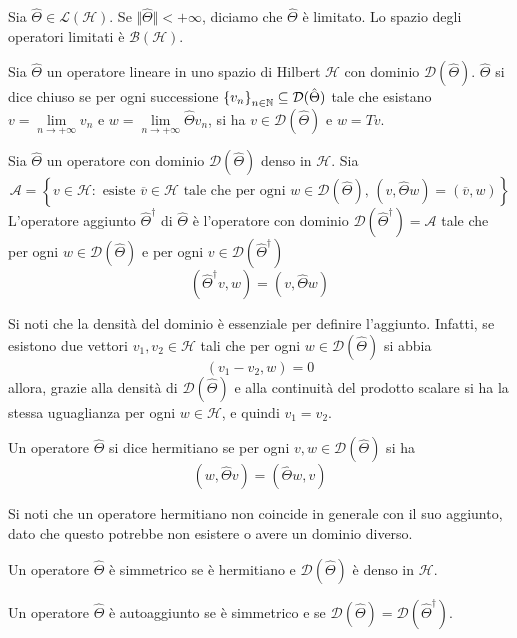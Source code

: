 \documentclass[a4paper, 11pt]{article}
\renewcommand{\H}{\mathcal{H}}
\begin{document}
\begin{definition}
	Sia $\hat{\Theta}\in\mathcal{L}(\H)$. Se $\Vert{\hat{\Theta}}\Vert<+\infty$, diciamo che $\hat{\Theta}$ è limitato. Lo spazio degli operatori limitati è $\mathcal{B}(\H)$.
\end{definition}
\begin{definition}
	Sia $\hat{\Theta}$ un operatore lineare in uno spazio di Hilbert $\H$ con dominio $\mathcal{D}(\hat{\Theta})$. $\hat{\Theta}$ si dice chiuso se per ogni successione $\left\{v_n\right\}_{n\in\mathbb{N}}\subseteq\mathcal{D}(\hat{\Theta})$ tale che esistano $v=\lim\limits_{n\to+\infty}v_n$ e $w=\lim\limits_{n\to+\infty}\hat{\Theta}v_n$, si ha $v\in\mathcal{D}(\hat{\Theta})$ e $w=Tv$. 
\end{definition}
\begin{definition}
	Sia $\hat{\Theta}$ un operatore con dominio $\mathcal{D}(\hat{\Theta})$ denso in $\H$. Sia
	\[\mathcal{A}=\left\{v\in\H:\textrm{ esiste }\overline{v}\in\H\textrm{ tale che per ogni }w\in\mathcal{D}(\hat{\Theta}),\,(v,\hat{\Theta}w)=(\overline{v},w)\right\}\]
	L'operatore aggiunto $\hat{\Theta}^\dagger$ di $\hat{\Theta}$ è l'operatore con dominio $\mathcal{D}(\hat{\Theta}^\dagger)=\mathcal{A}$ tale che per ogni $w\in\mathcal{D}(\hat{\Theta})$ e per ogni $v\in\mathcal{D}(\hat{\Theta}^\dagger)$
	\[(\hat{\Theta}^\dagger v,w)=(v,\hat{\Theta}w)\]
\end{definition}
Si noti che la densità del dominio è essenziale per definire l'aggiunto. Infatti, se esistono due vettori $v_1,v_2\in\H$ tali che per ogni $w\in\mathcal{D}(\hat{\Theta})$ si abbia
\[(v_1-v_2,w)=0\]
allora, grazie alla densità di $\mathcal{D}(\hat{\Theta})$ e alla continuità del prodotto scalare si ha la stessa uguaglianza per ogni $w\in\H$, e quindi $v_1=v_2$.
\begin{definition}
	Un operatore $\hat{\Theta}$ si dice hermitiano se per ogni $v,w\in\mathcal{D}(\hat{\Theta})$ si ha
	\[(w,\hat{\Theta}v)=(\hat{\Theta}w,v)\]
\end{definition}
Si noti che un operatore hermitiano non coincide in generale con il suo aggiunto, dato che questo potrebbe non esistere o avere un dominio diverso.
\begin{definition}
	Un operatore $\hat{\Theta}$ è simmetrico se è hermitiano e $\mathcal{D}(\hat{\Theta})$ è denso in $\H$.
\end{definition}
\begin{definition}
	Un operatore $\hat{\Theta}$ è autoaggiunto se è simmetrico e se $\mathcal{D}(\hat{\Theta})=\mathcal{D}(\hat{\Theta}^\dagger)$.
\end{definition}
\end{document}
